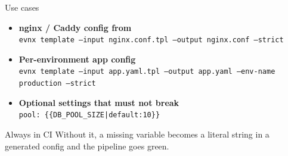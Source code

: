 \begin{frame}{Use cases}
  \begin{itemize}
    \item \textbf{nginx / Caddy config from }\\
      {\footnotesize\texttt{evnx template --input nginx.conf.tpl --output nginx.conf --strict}}
    \item \textbf{Per-environment app config}\\
      {\footnotesize\texttt{evnx template --input app.yaml.tpl --output app.yaml --env-name production --strict}}
    \item \textbf{Optional settings that must not break }\\
      {\footnotesize\texttt{pool: \{\{DB\_POOL\_SIZE|default:10\}\}}}
  \end{itemize}

  \vspace{1em}
  \begin{block}{Always  in CI}
    Without it, a missing variable becomes a literal string in a generated
    config and the pipeline goes green.
  \end{block}
\end{frame}
